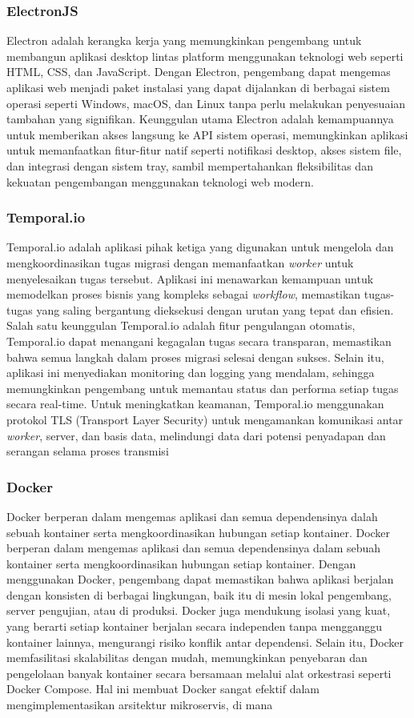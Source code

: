   \subsubsection{ElectronJS}
  Electron adalah kerangka kerja yang memungkinkan pengembang untuk membangun aplikasi desktop lintas platform menggunakan teknologi web seperti HTML, CSS, dan JavaScript. Dengan Electron, pengembang dapat mengemas aplikasi web menjadi paket instalasi yang dapat dijalankan di berbagai sistem operasi seperti Windows, macOS, dan Linux tanpa perlu melakukan penyesuaian tambahan yang signifikan. Keunggulan utama Electron adalah kemampuannya untuk memberikan akses langsung ke API sistem operasi, memungkinkan aplikasi untuk memanfaatkan fitur-fitur natif seperti notifikasi desktop, akses sistem file, dan integrasi dengan sistem tray, sambil mempertahankan fleksibilitas dan kekuatan pengembangan menggunakan teknologi web modern. 

  \subsubsection{Temporal.io}
  Temporal.io adalah aplikasi pihak ketiga yang digunakan untuk mengelola dan mengkoordinasikan tugas migrasi dengan memanfaatkan \emph{worker} untuk menyelesaikan tugas tersebut. Aplikasi ini menawarkan kemampuan untuk memodelkan proses bisnis yang kompleks sebagai \emph{workflow}, memastikan tugas-tugas yang saling bergantung dieksekusi dengan urutan yang tepat dan efisien. Salah satu keunggulan Temporal.io adalah fitur pengulangan otomatis, Temporal.io dapat menangani kegagalan tugas secara transparan, memastikan bahwa semua langkah dalam proses migrasi selesai dengan sukses. Selain itu, aplikasi ini menyediakan monitoring dan logging yang mendalam, sehingga memungkinkan pengembang untuk memantau status dan performa setiap tugas secara real-time. Untuk meningkatkan keamanan, Temporal.io menggunakan protokol TLS (Transport Layer Security) untuk mengamankan komunikasi antar \emph{worker}, server, dan basis data, melindungi data dari potensi penyadapan dan serangan selama proses transmisi

  \subsubsection{Docker}
  Docker berperan dalam mengemas aplikasi dan semua dependensinya dalah sebuah kontainer serta mengkoordinasikan hubungan setiap kontainer. Docker berperan dalam mengemas aplikasi dan semua dependensinya dalam sebuah kontainer serta mengkoordinasikan hubungan setiap kontainer. Dengan menggunakan Docker, pengembang dapat memastikan bahwa aplikasi berjalan dengan konsisten di berbagai lingkungan, baik itu di mesin lokal pengembang, server pengujian, atau di produksi. Docker juga mendukung isolasi yang kuat, yang berarti setiap kontainer berjalan secara independen tanpa mengganggu kontainer lainnya, mengurangi risiko konflik antar dependensi. Selain itu, Docker memfasilitasi skalabilitas dengan mudah, memungkinkan penyebaran dan pengelolaan banyak kontainer secara bersamaan melalui alat orkestrasi seperti Docker Compose. Hal ini membuat Docker sangat efektif dalam mengimplementasikan arsitektur mikroservis, di mana 
